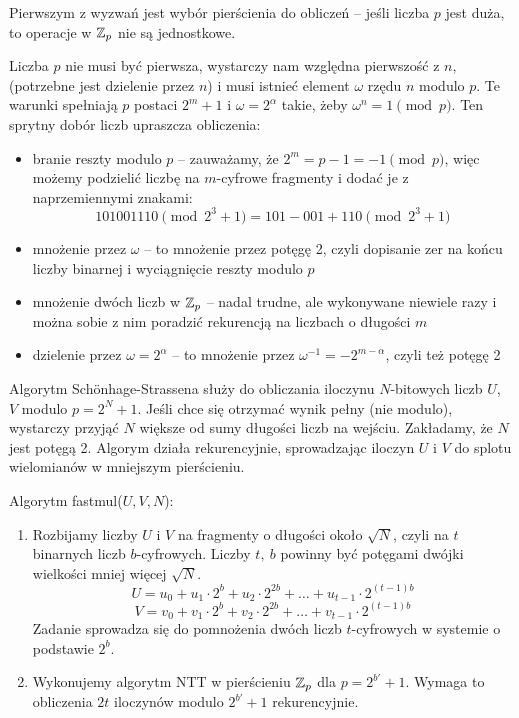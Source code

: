 Pierwszym z wyzwań jest wybór pierścienia do obliczeń -- jeśli liczba \( p \) jest duża, to operacje w \( \mathbb{Z}_p \) nie są jednostkowe.

Liczba \( p \) nie musi być pierwsza, wystarczy nam względna pierwszość z \( n \), (potrzebne jest dzielenie przez \( n \)) i musi istnieć element \( \omega \) rzędu \( n \) modulo \( p \). Te warunki spełniają \( p \) postaci \( 2^m + 1 \) i \( \omega = 2^{\alpha} \) takie, żeby \( \omega^n = 1 \pmod{p} \). Ten sprytny dobór liczb upraszcza obliczenia:
\begin{itemize}
    \item branie reszty modulo \( p \) -- zauważamy, że \( 2^m = p - 1 = -1 \pmod{p} \), więc możemy podzielić liczbę na \( m \)-cyfrowe fragmenty i dodać je z naprzemiennymi znakami:
    \[
        101001110 \pmod{2^3 + 1} = 101 - 001 + 110 \pmod{2^3 + 1} 
    \]
    \item mnożenie przez \( \omega \) -- to mnożenie przez potęgę 2, czyli dopisanie zer na końcu liczby binarnej i wyciągnięcie reszty modulo \( p \)
    \item mnożenie dwóch liczb w \( \mathbb{Z}_p \) -- nadal trudne, ale wykonywane niewiele razy i można sobie z nim poradzić rekurencją na liczbach o długości \( m \)
    \item dzielenie przez \( \omega = 2^{\alpha} \) -- to mnożenie przez \( \omega^{-1} = -2^{m-\alpha} \), czyli też potęgę 2
\end{itemize}

Algorytm Sch{\"o}nhage-Strassena służy do obliczania iloczynu \( N \)-bitowych liczb \( U \), \( V \) modulo \( p = 2^N + 1 \).
Jeśli chce się otrzymać wynik pełny (nie modulo), wystarczy przyjąć \( N \) większe od sumy długości liczb na wejściu. Zakładamy, że \( N \) jest potęgą 2. Algorym działa rekurencyjnie, sprowadzając iloczyn \( U \) i \( V \) do splotu wielomianów w mniejszym pierścieniu.

\begin{greyframe}
    Algorytm fastmul(\( U, V, N \)):
    \begin{enumerate}
        \item Rozbijamy liczby \( U \) i \( V \) na fragmenty o długości około \( \sqrt{N} \), czyli na \( t \) binarnych liczb \( b \)-cyfrowych. Liczby \( t, \ b \) powinny być potęgami dwójki wielkości mniej więcej \( \sqrt{N} \).
        \[
            U = u_0 + u_1 \cdot 2^b + u_2 \cdot 2^{2b} + \ldots + u_{t-1} \cdot  2^{(t-1)b}
        \]
        \[
            V = v_0 + v_1 \cdot 2^b + v_2 \cdot 2^{2b} + \ldots + v_{t-1} \cdot 2^{(t-1)b}
        \]
        Zadanie sprowadza się do pomnożenia dwóch liczb \( t \)-cyfrowych w systemie o podstawie \( 2^b \).

        \item Wykonujemy algorytm NTT w pierścieniu \( \mathbb{Z}_p \) dla \( p = 2^{b'} + 1 \). Wymaga to obliczenia \( 2t \) iloczynów modulo \( 2^{b'} + 1 \) rekurencyjnie.
    \end{enumerate}
\end{greyframe}

